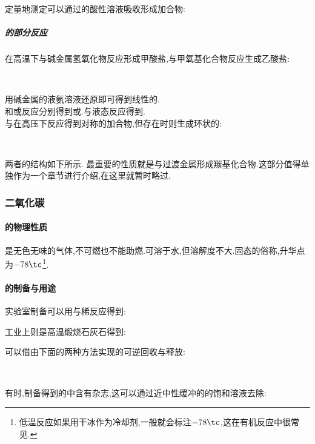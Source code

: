 \documentclass{ctexart}
\begin{document}
\begin{center}
\end{center}
定量地测定可以通过的酸性溶液吸收形成加合物:
\begin{center}
\end{center}
\subparagraph{{}的部分反应}
在高温下与碱金属氢氧化物反应形成甲酸盐,与甲氧基化合物反应生成乙酸盐:
\begin{center}
    \\
\end{center}

\indent {}用碱金属的液氨溶液还原即可得到线性的.\\
\indent {}和或反应分别得到或.与液态反应得到.\\
\indent {}与在高压下反应得到对称的加合物,但存在时则生成环状的:
\begin{center}
    \\
\end{center}
两者的结构如下所示.
最重要的性质就是与过渡金属形成羰基化合物.这部分值得单独作为一个章节进行介绍,在这里就暂时略过.
\subsubsection{二氧化碳}
\paragraph{的物理性质}
是无色无味的气体,不可燃也不能助燃.可溶于水,但溶解度不大.固态的俗称,升华点为$-78\tc$\footnote{低温反应如果用干冰作为冷却剂,一般就会标注$-78\tc$,这在有机反应中很常见.}.
\paragraph{的制备与用途}
实验室制备可以用与稀反应得到:
\begin{center}
\end{center}
工业上则是高温煅烧石灰石得到:
\begin{center}
\end{center}
可以借由下面的两种方法实现的可逆回收与释放:
\begin{center}
    \\
\end{center}
有时,制备得到的中含有杂志,这可以通过近中性缓冲的的饱和溶液去除:
\begin{center}
\end{center}
\end{document}
